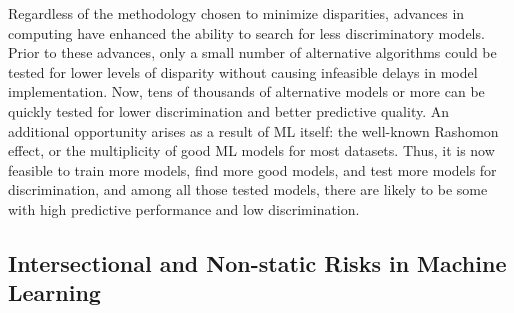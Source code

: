 \documentclass[information,article,submit,moreauthors,pdftex]{definitions/mdpi}
\begin{document}
Regardless of the methodology chosen to minimize disparities, advances in computing have enhanced the ability to search for less discriminatory models.  Prior to these advances, only a small number of alternative algorithms could be tested for lower levels of disparity without causing infeasible delays in model implementation.  Now, tens of thousands of alternative models or more can be quickly tested for lower discrimination and better predictive quality.  An additional opportunity arises as a result of ML itself: the well-known Rashomon effect, or the multiplicity of good ML models for most datasets. Thus, it is now feasible to train more models, find more good models, and test more models for discrimination, and among all those tested models, there are likely to be some with high predictive performance and low discrimination.

\subsection{Intersectional and Non-static Risks in Machine Learning}
\end{document}
